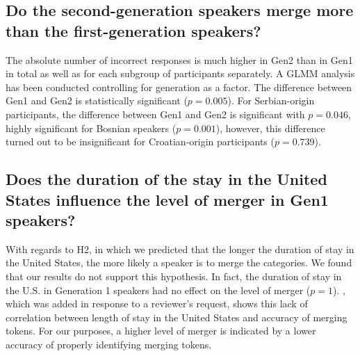 \documentclass[output=paper,modfonts,newtxmath,hidelinks,]{langscibook}
\begin{document}
\subsection{Do the second-generation speakers merge more than the first-generation speakers?}\label{sec:mihajlovic:5.2}

The absolute number of incorrect responses is much higher in Gen2 than in Gen1 in total as well as for each subgroup of participants separately. A GLMM analysis has been conducted controlling for generation as a factor. The difference between Gen1 and Gen2 is statistically significant ($p=0.005$). For Serbian-origin participants, the difference between Gen1 and Gen2 is significant with $p=0.046$, highly significant for Bosnian speakers ($p=0.001$), however, this difference turned out to be insignificant for Croatian-origin participants ($p=0.739$).


\subsection{Does the duration of the stay in the United States influence the level of merger in Gen1 speakers?}\label{sec:mihajlovic:5.3}

With regards to H2, in which we predicted that the longer the duration of stay in the United States, the more likely a speaker is to merge the categories. We found that our results do not support this hypothesis. In fact, the duration of stay in the U.S. in Generation 1 speakers had no effect on the level of merger ($p=1$). , which was added in response to a reviewer’s request, shows this lack of correlation between length of stay in the United States and accuracy of merging tokens. For our purposes, a higher level of merger is indicated by a lower accuracy of properly identifying merging tokens.
\end{document}
